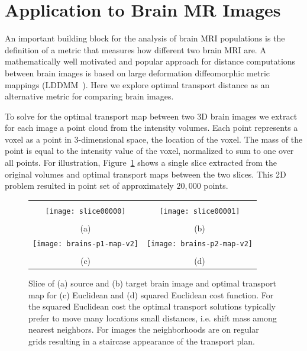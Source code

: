 \documentclass[twoside,11pt]{article}
\begin{document}
\section{Application to Brain MR Images}
\label{s:brainMR}
An important building block for the analysis of brain MRI populations is the
definition of a metric that measures how different two brain MRI are. A
mathematically well motivated and popular approach for distance computations
between brain images is based on large deformation diffeomorphic metric mappings
(LDDMM~\citep{miller2002metrics}). Here we explore optimal transport distance
as an alternative metric for comparing brain images.

To solve for the optimal transport map between two 3D brain images we extract
for each image a point cloud from the intensity volumes. Each point represents
a voxel as a point in 3-dimensional space, the location of the voxel. The mass
of the point is equal to the intensity value of the voxel, normalized to sum to
one over all points.  For illustration, Figure~\ref{fig:brains} shows a single
slice extracted from the original volumes and optimal transport maps between
the two slices. This 2D problem resulted in point set of approximately $20,000$
points. 
\begin{figure}[bth]
\centering
\begin{tabular}{cc}
                       \vspace{-0.1in} \\
\texttt{[image: slice00000]} &
\texttt{[image: slice00001]} \\
                       \vspace{-0.1in} \\
                   (a) & (b) \\
\texttt{[image: brains-p1-map-v2]} &
\texttt{[image: brains-p2-map-v2]} \\
                       \vspace{-0.1in} \\
                   (c) & (d)
\end{tabular}
  \vspace{-0.1in}
\caption{
  \label{fig:brains}
 Slice of (a) source and (b) target brain image and optimal transport map for
 (c) Euclidean and (d) squared Euclidean cost function. For the squared
 Euclidean cost the optimal transport solutions typically prefer to move many
 locations small distances, i.e. shift mass among nearest neighbors. For images
 the neighborhoods are on regular grids resulting in a staircase appearance of
 the transport plan.  } 
 \end{figure}
\end{document}
